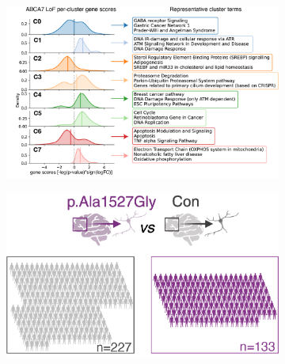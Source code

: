 \begin{figure}[ht]
\begin{subfigure}[t]{0.45\textwidth}
        \caption{}
        \includegraphics[width=\textwidth]{./main_plots/kl_densities.png}        
    \end{subfigure}
    \begin{subfigure}[t]{0.3\textwidth}
        \caption{}
        \includegraphics[width=\textwidth]{./main_plots/common_var_cohort_cartoon.png}        
    \end{subfigure}
    \hspace{0.01\textwidth} %
    \begin{subfigure}[t]{0.225\textwidth}
        \caption{}

\end{subfigure}
\end{figure}
